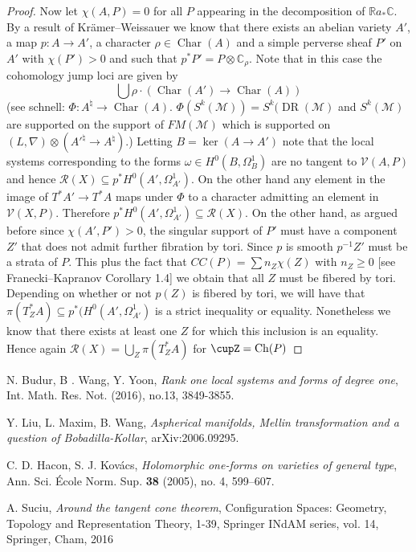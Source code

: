 \documentclass[a4paper,12pt,reqno]{amsart}
\theoremstyle{plain}
\theoremstyle{definition}
\theoremstyle{remark}
\DeclareMathOperator{\Char}{Char}
\newcommand{\sM}{\mathcal{M}}
\newcommand{\sR}{\mathcal{R}}
\newcommand\sV{{\mathcal V}}
\newcommand{\bbC}{\mathbb{C}}
\newcommand{\bbR}{\mathbb{R}}
\DeclareMathOperator{\DR}{DR}
\DeclareMathOperator{\Ch}{Ch}
\begin{document}
\begin{proof}
Now let $\chi(A, P) = 0$ for all $P$ appearing in the decomposition of $\bbR a_*\bbC$. By a result of Kr\"amer--Weissauer we know that there exists an abelian variety $A'$, a map $p\colon A\to A'$,
a character $\rho\in \Char(A)$ and a simple perverse sheaf $P'$ on
$A'$ with $\chi(P')>0$ and such that $p^*P'  = P\otimes \bbC_{\rho}$. Note that in this case the cohomology jump loci are given by
\[\bigcup \rho\cdot(\Char(A')\to \Char(A))\]
(see schnell: $\Phi : A^{\natural} \to \Char(A)$. $\Phi(S^k(\sM)) = S^k(\DR(\sM)$ and $S^k(\sM)$ are supported on the support of $FM(\sM)$ which 
is supported on $(L,\nabla)\otimes(A'^{\natural}\to A^{\natural})$.)
Letting $B = \ker(A\to A')$ note that the local systems corresponding to the forms $\omega\in H^0(B, \Omega_B^1)$ are no tangent to $\sV(A, P)$ and hence 
$\sR(X)\subseteq p^*H^0(A', \Omega_{A'}^1)$. On the other hand any element in the image of $T^*A' \to T^*A$
maps under $\Phi$ to a character admitting an element in $\sV(X, P)$. Therefore $p^*H^0(A', \Omega_{A'}^1)\subseteq \sR(X)$. 
On the other hand, as argued before since $\chi(A',P')>0$, the singular support of $P'$ must have a component $Z'$ that does not admit further fibration by tori.
Since $p$ is smooth $p^{-1}Z'$ must be a strata of $P$. This plus the fact that $CC(P) = \sum n_{Z}\chi(Z)$ with $n_Z\geq 0$ [see Franecki--Kapranov Corollary 1.4]
we obtain that all $Z$ must be fibered by tori. Depending on whether or not $p(Z)$ is fibered by tori, we will have that $\pi(T^*_ZA) \subseteq p^*(H^0(A',\Omega_{A'}^1)$ is a strict inequality or equality. Nonetheless we know that there exists at least one $Z$ for which this inclusion is an equality. Hence again
$\sR(X) = \bigcup_Z \pi(T^*_{Z}A)$ for $\cupZ = \Ch(P)$


\end{proof}




\begin{thebibliography}{ADMSP}



 N. Budur, B . Wang, Y. Yoon, {\it Rank one local systems and forms of degree one}, Int. Math. Res. Not. (2016), no.13, 3849-3855.


 Y. Liu, L. Maxim, B. Wang, \textit{Aspherical manifolds, Mellin transformation and a question of Bobadilla-Kollar}, arXiv:2006.09295.

 C. D. Hacon, S. J. Kov\'acs, \textit{Holomorphic one-forms on varieties of general type}, Ann. Sci. \'Ecole Norm. Sup. \textbf{38} (2005), no. 4, 599--607.


 A. Suciu, {\it Around the tangent cone theorem}, Configuration Spaces: Geometry, Topology and Representation Theory, 1-39, Springer INdAM series, vol. 14, Springer, Cham, 2016




\end{thebibliography}



\end{document}
